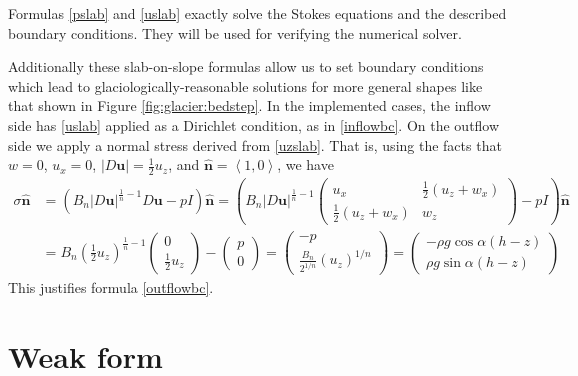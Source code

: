 \documentclass[letterpaper,final,12pt,reqno]{amsart}
\newcommand{\hbn}{\hat{\mathbf{n}}}
\newcommand{\bu}{\mathbf{u}}
\begin{document}
Formulas \eqref{pslab} and \eqref{uslab} exactly solve the Stokes equations and the described boundary conditions.  They will be used for verifying the numerical solver.

Additionally these slab-on-slope formulas allow us to set boundary conditions which lead to glaciologically-reasonable solutions for more general shapes like that shown in Figure \ref{fig:glacier:bedstep}.  In the implemented cases, the inflow side has \eqref{uslab} applied as a Dirichlet condition, as in \eqref{inflowbc}.  On the outflow side we apply a normal stress derived from \eqref{uzslab}.  That is, using the facts that $w=0$, $u_x=0$, $|D\bu| = \frac{1}{2} u_z$, and $\hbn=\left<1,0\right>$, we have
\begin{align*}
\sigma \hbn &= \left(B_n |D\bu|^{\frac{1}{n}-1} D\bu - pI\right)\hbn = \left(B_n |D\bu|^{\frac{1}{n}-1} \begin{pmatrix} u_x & \frac{1}{2}(u_z+w_x) \\ \frac{1}{2}(u_z+w_x) & w_z \end{pmatrix} - pI\right)\hbn \\
    &= B_n \left(\frac{1}{2} u_z\right)^{\frac{1}{n}-1} \begin{pmatrix} 0 \\ \frac{1}{2} u_z \end{pmatrix} - \begin{pmatrix} p \\ 0 \end{pmatrix} = \begin{pmatrix} - p \\ \frac{B_n}{2^{1/n}} (u_z)^{1/n} \end{pmatrix} = \begin{pmatrix} - \rho g\cos\alpha (h-z) \\ \rho g\sin\alpha (h-z) \end{pmatrix}
\end{align*}
This justifies formula \eqref{outflowbc}.


\section{Weak form} \label{sec:weakform}
\end{document}
